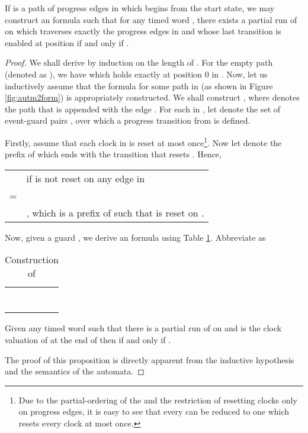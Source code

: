 \documentclass{llncs}
\newcommand{\potdta}{\mbox{}}
\newcommand{\mitlfpinf}{\mbox{}}
\begin{document}
\begin{lemma}
If  is a path of progress edges in  which begins from the start state, we may construct an \mitlfpinf\/ formula  such that for any timed word , there exists a partial run of  on  which traverses exactly the progress edges in  and whose last transition is enabled at position  if and only if .
\end{lemma}
\begin{proof}
We shall derive  by induction on the length of . For the empty path (denoted as ), we have  which holds exactly at position 0 in . Now, let us inductively assume that the formula  for some path  in  (as shown in Figure \ref{fig:autm2form}) is appropriately constructed. We shall construct , where  denotes the path  that is appended with the edge .   For each   in , let  denote the set of event-guard pairs , over which a progress transition from  is defined. 

Firstly, assume that each clock in  is reset at most once\footnote{Due to the partial-ordering of the \potdta\/ and the restriction of resetting clocks only on progress edges, it is easy to see that every \potdta\/ can be reduced to one which resets every clock at most once.}. Now let  denote the prefix of  which ends with the transition that resets . Hence,\\
\begin{tabular}{l|l}
& if  is not reset on any edge in \\
 =&\\
&, which is a prefix of  such that  is reset on .\\
\end{tabular}

\medskip
Now, given a guard , we derive an \mitlfpinf\/ formula  using Table \ref{tab:guard1}. Abbreviate  as \\
\begin{table}
\begin{center}
\begin{tabular}{|l|l|}
\hline
   &       \\
\hline
\hline
 & \\  
\hline
 & \\
\hline
 & \\
\hline
 & \\
\hline
 & \\
\hline
 & \\
\hline
 & \\
\hline  
\end{tabular}
\caption{Construction of }
\label{tab:guard1}
\end{center}
\end{table}
\begin{proposition}
\label{prop:guard}
Given any timed word  such that there is a partial run  of  on  and  is the clock valuation of at the end of  then  if and only if . 
\end{proposition}
The proof of this proposition is directly apparent from the inductive hypothesis and the semantics of the automata. 


\end{proof}
\end{document}
